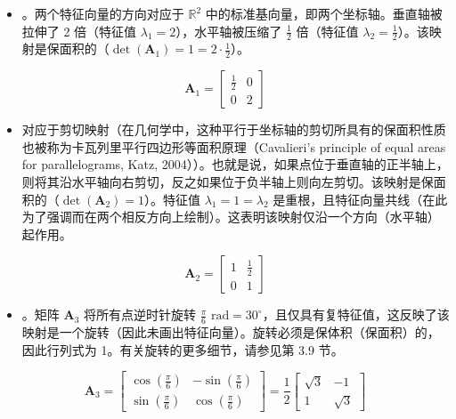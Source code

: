 \begin{itemize}
\item 。两个特征向量的方向对应于 $ \mathbb{R}^2 $ 中的标准基向量，即两个坐标轴。垂直轴被拉伸了 2 倍（特征值 $ \lambda_1 = 2 $），水平轴被压缩了 $ \frac{1}{2} $ 倍（特征值 $ \lambda_2 = \frac{1}{2} $）。该映射是保面积的（$ \det(\boldsymbol{A}_1) = 1 = 2 \cdot \frac{1}{2} $）。
\end{itemize}
\begin{equation*}
\boldsymbol{A}_1 = \begin{bmatrix} \frac{1}{2} & 0 \\ 0 & 2 \end{bmatrix}
\end{equation*}
\begin{itemize}
\item 对应于剪切映射（在几何学中，这种平行于坐标轴的剪切所具有的保面积性质也被称为卡瓦列里平行四边形等面积原理（Cavalieri's principle of equal areas for parallelograms, Katz, 2004））。也就是说，如果点位于垂直轴的正半轴上，则将其沿水平轴向右剪切，反之如果位于负半轴上则向左剪切。该映射是保面积的（$ \det(\boldsymbol{A}_2) = 1 $）。特征值 $ \lambda_1 = 1 = \lambda_2 $ 是重根，且特征向量共线（在此为了强调而在两个相反方向上绘制）。这表明该映射仅沿一个方向（水平轴）起作用。
\end{itemize}
\begin{equation*}
\boldsymbol{A}_2 = \begin{bmatrix} 1 & \frac{1}{2} \\ 0 & 1 \end{bmatrix}
\end{equation*}
\begin{itemize}
\item 。矩阵 $ \boldsymbol{A}_3 $ 将所有点逆时针旋转 $ \frac{\pi}{6} \text{ rad} = 30^\circ $，且仅具有复特征值，这反映了该映射是一个旋转（因此未画出特征向量）。旋转必须是保体积（保面积）的，因此行列式为 1。有关旋转的更多细节，请参见第 3.9 节。
\end{itemize}
\begin{equation*}
\boldsymbol{A}_3 = \begin{bmatrix} \cos(\frac{\pi}{6}) & -\sin(\frac{\pi}{6}) \\ \sin(\frac{\pi}{6}) & \cos(\frac{\pi}{6}) \end{bmatrix} = \frac{1}{2} \begin{bmatrix} \sqrt{3} & -1 \\ 1 & \sqrt{3} \end{bmatrix}
\end{equation*}
